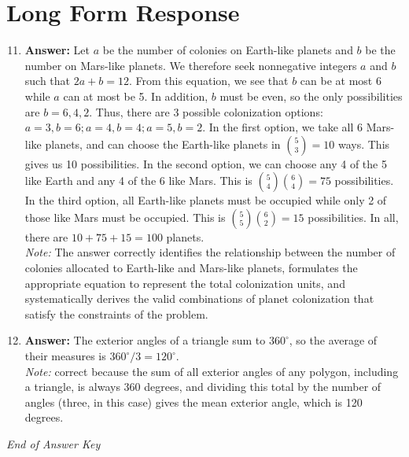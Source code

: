 \documentclass[12pt]{article}
\begin{document}
\section*{Long Form Response}
\begin{enumerate}[label=\arabic*.]
\setcounter{enumi}{10}
\item \textbf{Answer:} Let $a$ be the number of colonies on Earth-like planets and $b$ be the number on Mars-like planets. We therefore seek nonnegative integers $a$ and $b$ such that $2 a + b = 12$. From this equation, we see that $b$ can be at most 6 while $a$ can at most be 5. In addition, $b$ must be even, so the only possibilities are $b = 6, 4, 2$. Thus, there are 3 possible colonization options: $a = 3, b = 6; a=4, b = 4; a=5, b=2$. In the first option, we take all 6 Mars-like planets, and can choose the Earth-like planets in $\binom{5}{3} = 10$ ways. This gives us 10 possibilities. In the second option, we can choose any 4 of the 5 like Earth and any 4 of the 6 like Mars. This is $\binom{5}{4}\binom{6}{4} = 75$ possibilities. In the third option, all Earth-like planets must be occupied while only 2 of those like Mars must be occupied. This is $\binom{5}{5}\binom{6}{2} = 15$ possibilities. In all, there are $10 + 75 + 15 = \boxed{100}$ planets.
\\ \textit{Note:} The answer correctly identifies the relationship between the number of colonies allocated to Earth-like and Mars-like planets, formulates the appropriate equation to represent the total colonization units, and systematically derives the valid combinations of planet colonization that satisfy the constraints of the problem.
\item \textbf{Answer:} The exterior angles of a triangle sum to $360^\circ$, so the average of their measures is $360^\circ/3 = \boxed{120^\circ}$.
\\ \textit{Note:} correct because the sum of all exterior angles of any polygon, including a triangle, is always 360 degrees, and dividing this total by the number of angles (three, in this case) gives the mean exterior angle, which is 120 degrees.
\end{enumerate}

\vfill
\noindent\textit{End of Answer Key}
\end{document}
